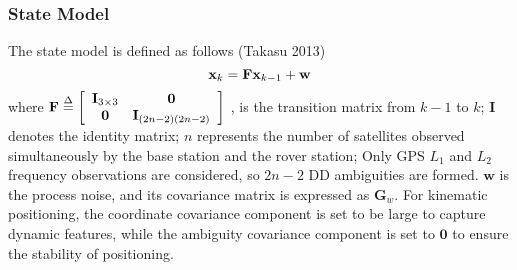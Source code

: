 \documentclass[final,3p,times]{elsarticle}
\begin{document}
	\subsubsection{State Model}
	The state model is defined as follows (Takasu 2013)
	\begin{equation}
	{{\bf{x}}_k} = {\bf{F}}{{\bf{x}}_{k - 1}} + {\bf{w}}
	\end{equation}
	where ${\bf{F}} \buildrel \Delta \over = \left[ {\begin{array}{*{20}{c}}
		{{{\bf{I}}_{3 \times 3}}}&{\bf{0}}\\
		{\bf{0}}&{{{\bf{I}}_{(2n - 2)(2n - 2)}}}
		\end{array}} \right]$ , is the transition matrix from $k-1$ to $k$; $\mathbf{I}$ denotes the identity matrix; $n$ represents the number of satellites observed simultaneously by the base station and the rover station; 
	Only GPS ${{L}_{1}}$ and ${{L}_{2}}$ frequency observations are considered, so $2n-2$ DD ambiguities are formed. 
	$\mathbf{w}$ is the process noise, and its covariance matrix is expressed as ${{\mathbf{G}}_{w}}$. 
	For kinematic positioning, the coordinate covariance component is set to be large to capture dynamic features, while the ambiguity covariance component is set to $\mathbf{0}$ to ensure the stability of positioning.
\end{document}
